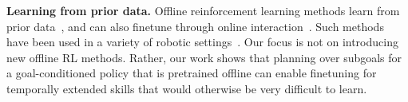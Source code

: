 \textbf{Learning from prior data.}
Offline reinforcement learning methods learn from prior data~\cite{lange2012batch, fujimoto2019off, kumar2019stabilizing, zhang2021brac, kumar2020conservative, fujimoto2021minimalist,singh2020cog}, and can also finetune through online interaction~\cite{nair2020awac, villaflor2020finetuning, lu2021awopt, Khazatsky2021WhatCI, lee2021finetuning, meng2021starcraft}. Such methods have been used in a variety of robotic settings~\cite{kalashnikov2018scalable,cabi2019scaling,kalashnikov2021mtopt,lu2021awopt}. Our focus is not on introducing new offline RL methods. Rather, our work shows that planning over subgoals for a goal-conditioned policy that is pretrained offline can enable finetuning for temporally extended skills that would otherwise be very difficult to learn.
